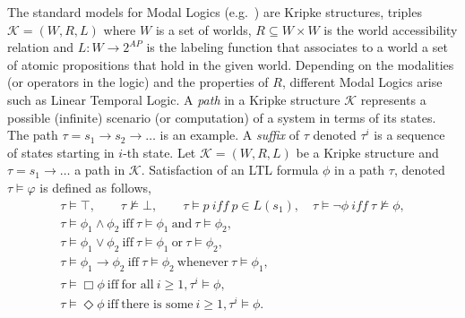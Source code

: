 \documentclass[a4paper,openany]{book}
\begin{document}
The standard models for Modal Logics (e.g.~\cite{goldblatt}) are Kripke structures, triples $\mathcal{K} = (W, R, L)$ where $W$ is a set of worlds, $R \subseteq W \times W$ is the world accessibility relation and $L : W \to 2^{\mathit{AP}}$ is the labeling function that associates to a world a set of atomic propositions that hold in the given world. Depending on the modalities (or operators in the logic) and the properties of $R$, different Modal Logics arise such as Linear Temporal Logic.
A \emph{path} in a Kripke structure $\mathcal{K}$ represents a possible (infinite) scenario (or computation) of a system in terms of its states. The path $\tau = s_1 \to s_2 \to \ldots$ is an example. A \emph{suffix} of $\tau$ denoted $\tau^i$ is a sequence of states starting in $i$-th state.
Let $\mathcal{K} = (W, R, L)$ be a Kripke structure and $\tau = s_1 \to \ldots$ a path in $\mathcal{K}$. Satisfaction of an LTL formula $\phi$ in a path $\tau$, denoted $\tau \models \varphi$ is defined as follows, %
$$\begin{array}{l}
\tau \models \top, \qquad \tau \not\models \bot, \qquad \tau \models p ~\mathit{iff}~ p \in L(s_1), \quad \tau \models \neg\phi ~\mathit{iff}~ \tau \not\models \phi, \\
\tau \models \phi_1 \land \phi_2 ~\mbox{iff}~ \tau \models \phi_1 ~\mbox{and}~ \tau \models \phi_2, \\
\tau \models \phi_1 \lor \phi_2 ~\mbox{iff}~ \tau \models \phi_1 ~\mbox{or}~ \tau \models \phi_2, \\
\tau \models \phi_1 \to \phi_2 ~\mbox{iff}~ \tau \models \phi_2 ~\mbox{whenever}~ \tau \models \phi_1, \\
\tau \models \Box \phi ~\mbox{iff}~ \mbox{for all}~ i \ge 1, \tau^i \models \phi, \\
\tau \models \Diamond \phi ~\mbox{iff}~ \mbox{there is some}~ i \ge 1, \tau^i \models \phi. \\
\end{array}$$
\end{document}
